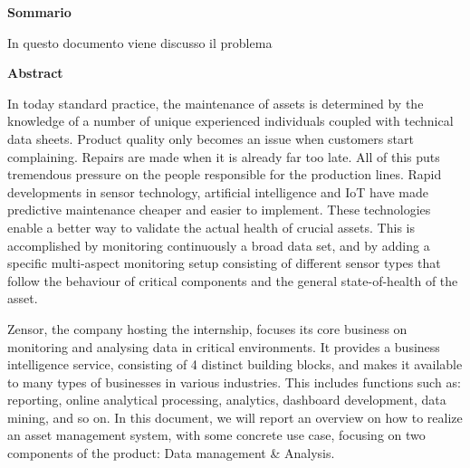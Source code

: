 \begin{center}
    \textbf{Sommario}
\end{center}
In questo documento viene discusso il problema 

\cleardoublepage

\begin{center}
    \textbf{Abstract}
\end{center}

In today standard practice, the maintenance of assets is determined by the knowledge of a number of unique experienced individuals coupled with technical data sheets.
Product quality only becomes an issue when customers start complaining. Repairs are made when it is already far too late. All of this puts tremendous pressure on the people responsible for the production lines. Rapid developments in sensor technology, artificial intelligence and IoT have made predictive maintenance cheaper and easier to implement. These technologies enable a better way to validate the actual health of crucial assets. This is accomplished by monitoring continuously a broad data set, and by adding a specific multi-aspect monitoring setup consisting of different sensor types that follow the behaviour of critical components and the general state-of-health of the asset.

Zensor, the company hosting the internship, focuses its core business on monitoring and analysing data in critical environments. It provides a business intelligence service, consisting of 4 distinct building blocks, and makes it available to many types of businesses in various industries. This includes functions such as: reporting, online analytical processing, analytics, dashboard development, data mining, and so on.
In this document, we will report an overview on how to realize an asset management system, with some concrete use case, focusing on two components of the product: Data management \& Analysis.

\cleardoublepage